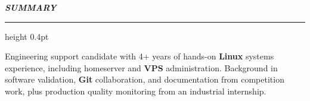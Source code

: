 {\noindent\fontsize{13pt}{16pt}\bfseries\itshape SUMMARY\par}
\vspace{0.5em}
{\color{lightgray}\hrule height 0.4pt}
\vspace{0.5em}
\noindent
Engineering support candidate with 4+ years of hands-on \textbf{Linux} systems experience, including homeserver and \textbf{VPS} administration. Background in software validation, \textbf{Git} collaboration, and documentation from competition work, plus production quality monitoring from an industrial internship.
\vspace{0.8em}
